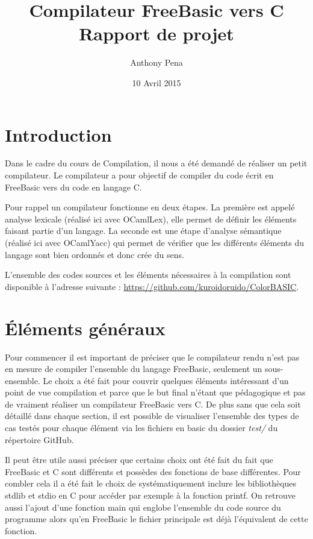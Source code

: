 \documentclass[french]{article}
\title{Compilateur FreeBasic vers C\\\large{Rapport de projet}}
\author{Anthony Pena}
\date{10 Avril 2015}
\begin{document}
\maketitle{}
\tableofcontents{}
\newpage{}
\part{Introduction}

Dans le cadre du cours de Compilation, il nous a été demandé de réaliser un petit compilateur. Le compilateur a pour objectif de compiler du code écrit en FreeBasic vers du code en langage C.

Pour rappel un compilateur fonctionne en deux étapes. La première est appelé analyse lexicale (réalisé ici avec OCamlLex), elle permet de définir les éléments faisant partie d'un langage. La seconde est une étape d'analyse sémantique (réalisé ici avec OCamlYacc) qui permet de vérifier que les différents éléments du langage sont bien ordonnés et donc crée du sens.

L'ensemble des codes sources et les éléments nécessaires à la compilation sont disponible à l'adresse suivante : \url{https://github.com/kuroidoruido/ColorBASIC}.

\part{Éléments généraux}
Pour commencer il est important de préciser que le compilateur rendu n'est pas en mesure de compiler l'ensemble du langage FreeBasic, seulement un sous-ensemble. Le choix a été fait pour couvrir quelques éléments intéressant d'un point de vue compilation et parce que le but final n'étant que pédagogique et pas de vraiment réaliser un compilateur FreeBasic vers C. De plus sans que cela soit détaillé dans chaque section, il est possible de visualiser l'ensemble des types de cas testés pour chaque élément via les fichiers en basic du dossier \emph{test/} du répertoire GitHub.

Il peut être utile aussi préciser que certains choix ont été fait du fait que FreeBasic et C sont différents et possèdes des fonctions de base différentes. Pour combler cela il a été fait le choix de systématiquement inclure les bibliothèques stdlib et stdio en C pour accéder par exemple à la fonction printf. On retrouve aussi l'ajout d'une fonction main qui englobe l'ensemble du code source du programme alors qu'en FreeBasic le fichier principale est déjà l'équivalent de cette fonction.
\end{document}
